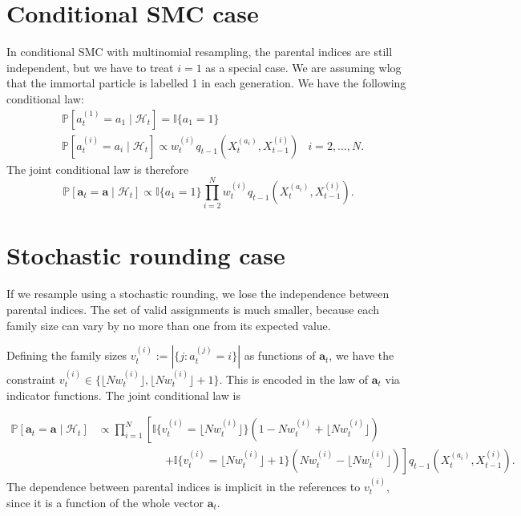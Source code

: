 \documentclass[fleqn]{article}
\newcommand{\PR}{\mathbb{P}}
\newcommand{\I}[1]{\mathbb{I}\{#1\}}
\newcommand{\vt}[2][t]{v_{#1}^{(#2)}}
\newcommand{\wt}[2][t]{w_{#1}^{(#2)}}
\newcommand{\flnw}{\lfloor N\wt{i} \rfloor }
\begin{document}
\section*{Conditional SMC case}
In conditional SMC with multinomial resampling, the parental indices are still independent, but we have to treat $i=1$ as a special case. We are assuming wlog that the immortal particle is labelled 1 in each generation. We have the following conditional law:
\begin{align*}
&\PR [a_t^{(1)} = a_1 \mid \mathcal{H}_t] = \I{a_1=1}  & \\
&\PR [a_t^{(i)} = a_i \mid \mathcal{H}_t] \propto \wt{i} q_{t-1}(X_t^{(a_i)}, X_{t-1}^{(i)}) & i=2,\dots,N .
\end{align*}
The joint conditional law is therefore
\begin{equation*}
\PR [\mathbf{a}_t = \mathbf{a} \mid \mathcal{H}_t] \propto \I{a_1 = 1} \prod_{i=2}^N \wt{i} q_{t-1}(X_t^{(a_i)}, X_{t-1}^{(i)}).
\end{equation*}

\section*{Stochastic rounding case}
If we resample using a stochastic rounding, we lose the independence between parental indices. The set of valid assignments is much smaller, because each family size can vary by no more than one from its expected value.

Defining the family sizes $\vt{i} := |\{ j : a_t^{(j)} = i \}|$ as functions of $\mathbf{a}_t$, we have the constraint $\vt{i} \in \{\flnw, \flnw +1\}$. This is encoded in the law of $\mathbf{a}_t$ via indicator functions. The joint conditional law is

\begin{align*}
\PR [\mathbf{a}_t = \mathbf{a} \mid \mathcal{H}_t] &\propto \prod_{i=1}^N \left[ \I{\vt{i} = \flnw}(1- N\wt{i} + \flnw) \right.\\
&\qquad\qquad\qquad \left. + \I{\vt{i} = \flnw +1}(N\wt{i}-\flnw)\right] q_{t-1}(X_t^{(a_i)}, X_{t-1}^{(i)}).
\end{align*}
The dependence between parental indices is implicit in the references to $\vt{i}$, since it is a function of the whole vector $\mathbf{a}_t$.
\end{document}
